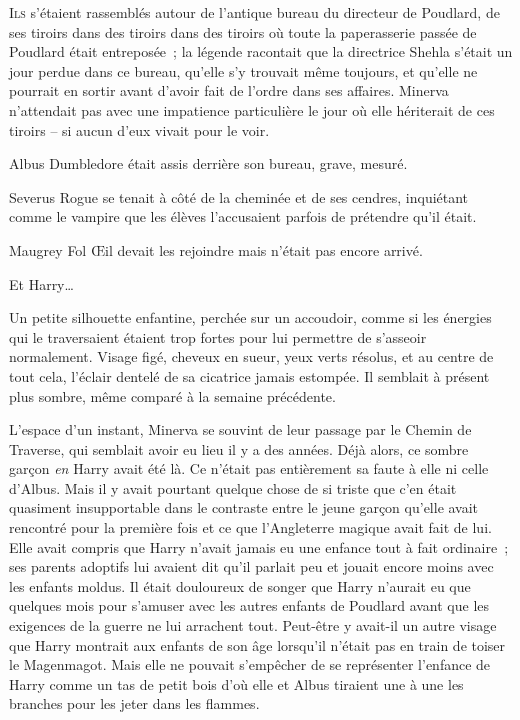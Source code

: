 \lettrine{I}{ls} s'étaient rassemblés autour de l'antique bureau du directeur de Poudlard, de ses tiroirs dans des tiroirs dans des tiroirs où toute la paperasserie passée de Poudlard était entreposée~; la légende racontait que la directrice Shehla s'était un jour perdue dans ce bureau, qu'elle s'y trouvait même toujours, et qu'elle ne pourrait en sortir avant d'avoir fait de l'ordre dans ses affaires. Minerva n'attendait pas avec une impatience particulière le jour où elle hériterait de ces tiroirs -- si aucun d'eux vivait pour le voir.

Albus Dumbledore était assis derrière son bureau, grave, mesuré.

Severus Rogue se tenait à côté de la cheminée et de ses cendres, inquiétant comme le vampire que les élèves l'accusaient parfois de prétendre qu'il était.

Maugrey Fol Œil devait les rejoindre mais n'était pas encore arrivé.

Et Harry…

Un petite silhouette enfantine, perchée sur un accoudoir, comme si les énergies qui le traversaient étaient trop fortes pour lui permettre de s'asseoir normalement. Visage figé, cheveux en sueur, yeux verts résolus, et au centre de tout cela, l'éclair dentelé de sa cicatrice jamais estompée. Il semblait à présent plus sombre, même comparé à la semaine précédente.

L'espace d'un instant, Minerva se souvint de leur passage par le Chemin de Traverse, qui semblait avoir eu lieu il y a des années. Déjà alors, ce sombre garçon \emph{en} Harry avait été là. Ce n'était pas entièrement sa faute à elle ni celle d'Albus. Mais il y avait pourtant quelque chose de si triste que c'en était quasiment insupportable dans le contraste entre le jeune garçon qu'elle avait rencontré pour la première fois et ce que l'Angleterre magique avait fait de lui. Elle avait compris que Harry n'avait jamais eu une enfance tout à fait ordinaire~; ses parents adoptifs lui avaient dit qu'il parlait peu et jouait encore moins avec les enfants moldus. Il était douloureux de songer que Harry n'aurait eu que quelques mois pour s'amuser avec les autres enfants de Poudlard avant que les exigences de la guerre ne lui arrachent tout. Peut-être y avait-il un autre visage que Harry montrait aux enfants de son âge lorsqu'il n'était pas en train de toiser le Magenmagot. Mais elle ne pouvait s'empêcher de se représenter l'enfance de Harry comme un tas de petit bois d'où elle et Albus tiraient une à une les branches pour les jeter dans les flammes.

